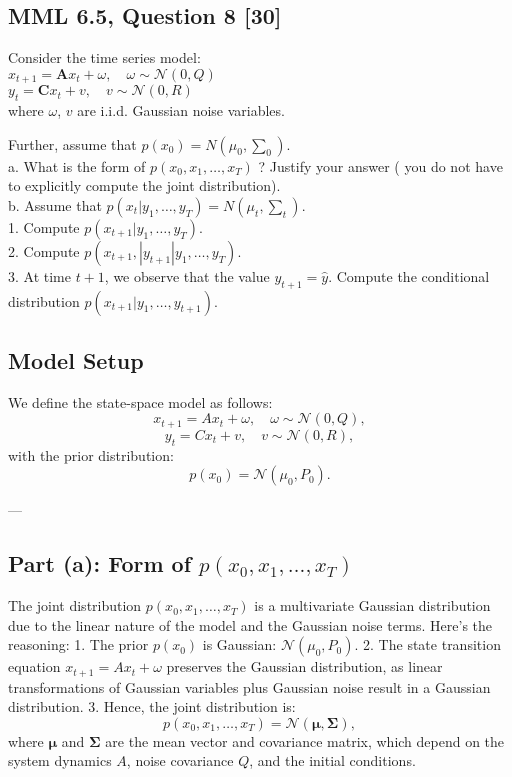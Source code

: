 \documentclass[12pt]{article}
\begin{document}
\subsection*{MML 6.5, Question 8 [30]}
Consider the time series model:\\
\( x_{t+1} = \textbf{A}x_t + \omega, \quad \omega \sim \mathcal{N}(0, Q) \)\\
\( y_t = \textbf{C} x_t + v, \quad v \sim \mathcal{N}(0, R) \)\\
where \( \omega \), $v$ are i.i.d. Gaussian noise variables. 

Further, assume that \( p(x_0)  = N( \mu_0, \sum_0) \).\\

a. What is the form of \( p(x_0,x_1, \dots ,x_T) \) ? Justify your answer ( you do not have to explicitly compute the joint distribution).\\
b. Assume that \( p(x_t | y_1,\dots ,y_T) = N(\mu_t, \sum_t) \).\\
1. Compute \( p(x_{t+1} | y_1,\dots ,y_T) \).\\
2. Compute \( p(x_{t+1},| y_{t+1} | y_1,\dots ,y_T) \).\\
3. At time \( t + 1 \), we observe that the value \( y_{t+1} = \hat{y} \). Compute the conditional distribution \( p(x_{t+1} | y_1, \dots , y_{t+1}) \). 
\subsection*{Model Setup}
We define the state-space model as follows:
\[
x_{t+1} = A x_t + \omega, \quad \omega \sim \mathcal{N}(0, Q),
\]
\[
y_t = C x_t + v, \quad v \sim \mathcal{N}(0, R),
\]
with the prior distribution:
\[
p(x_0) = \mathcal{N}(\mu_0, P_0).
\]

---

\subsection*{Part (a): Form of $p(x_0, x_1, \dots, x_T)$}

The joint distribution \( p(x_0, x_1, \dots, x_T) \) is a multivariate Gaussian distribution due to the linear nature of the model and the Gaussian noise terms. Here's the reasoning:
1. The prior \( p(x_0) \) is Gaussian: \( \mathcal{N}(\mu_0, P_0) \).
2. The state transition equation \( x_{t+1} = A x_t + \omega \) preserves the Gaussian distribution, as linear transformations of Gaussian variables plus Gaussian noise result in a Gaussian distribution.
3. Hence, the joint distribution is:
\[
p(x_0, x_1, \dots, x_T) = \mathcal{N}(\mathbf{\mu}, \mathbf{\Sigma}),
\]
where \( \mathbf{\mu} \) and \( \mathbf{\Sigma} \) are the mean vector and covariance matrix, which depend on the system dynamics \( A \), noise covariance \( Q \), and the initial conditions.
\end{document}
